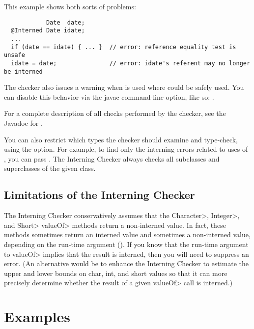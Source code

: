 This example shows both sorts of problems:

\begin{Verbatim}
            Date  date;
  @Interned Date idate;
  ...
  if (date == idate) { ... }  // error: reference equality test is unsafe
  idate = date;               // error: idate's referent may no longer be interned
\end{Verbatim}

\label{lint-dotequals}

The checker also issues a warning when  is used where
\code{==} could be safely used.  You can disable this behavior via the
javac  command-line option, like so: .

For a complete description of all checks performed by
  the checker, see the Javadoc for
  .

\label{checking-class}
You can also restrict which types the checker should examine and type-check,
using the  option.  For example, to find only the
interning errors related to uses of , you can pass
.  The Interning Checker always checks all
subclasses and superclasses of the given class.


\subsection{Limitations of the Interning Checker\label{interning-limitations}}


The Interning Checker conservatively assumes that the \<Character>, \<Integer>,
and \<Short> \<valueOf> methods return a non-interned value.  In fact, these
methods sometimes return an interned value and sometimes a non-interned
value, depending on the run-time argument ().  If you know that the run-time argument to \<valueOf> implies that
the result is interned, then you will need to suppress an error.  (An
alternative would be to enhance the Interning Checker to estimate the upper
and lower bounds on char, int, and short values so that it can more
precisely determine whether the result of a given \<valueOf> call is
interned.)



\section{Examples\label{interning-example}}

